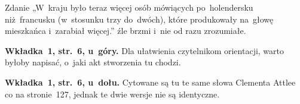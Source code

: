 \documentclass[a4paper,11pt]{article}
\begin{document}
\start {} Zdanie „W~kraju było teraz więcej osób
mówiących po~holendersku niż~francusku (w~stosunku trzy do~dwóch),
które produkowały na~głowę mieszkańca i~zarabiał więcej.” źle brzmi
i~nie od razu zrozumiałe.

\vspace{\spaceFour}



\start \textbf{Wkładka~1, str.~6, u~góry.} Dla ułatwienia czytelnikom
orientacji, warto byłoby napisać, o~jaki akt stworzenia tu chodzi.

\vspace{\spaceFour}



\start \textbf{Wkładka~1, str.~6, u~dołu.} Cytowane są tu te same słowa
Clementa Attlee co na stronie~127, jednak te dwie wersje nie są
identyczne.





\nopagebreak
{}
\end{document}
